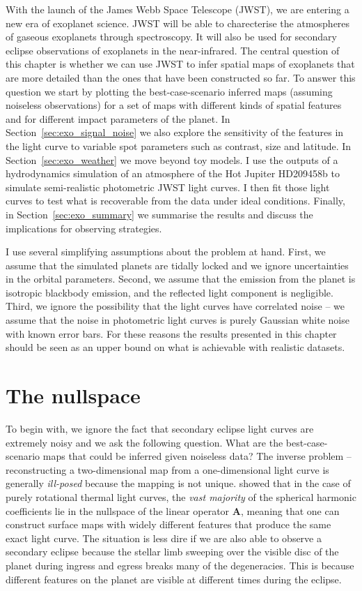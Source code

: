 \documentclass[12pt,dvipsnames]{report}
\begin{document}
With the launch of the James Webb Space Telescope (JWST), we are entering a new era of exoplanet 
science. JWST will be able to charecterise the atmospheres of gaseous exoplanets through 
spectroscopy. 
It will also be used for secondary eclipse observations of exoplanets 
in the near-infrared. The central question of this chapter is whether we can use JWST 
to infer spatial maps of exoplanets that are more detailed than the ones that have been constructed 
so far.
To answer this question we start by plotting the 
best-case-scenario inferred maps (assuming noiseless observations) for a set of maps 
with different kinds of spatial features and for different impact parameters of the planet. 
In Section~\ref{sec:exo_signal_noise} we also explore the sensitivity of the features in the light curve to variable spot parameters such
as contrast, size and latitude. 
In Section~\ref{sec:exo_weather} we move beyond toy models. I
use the outputs of a hydrodynamics simulation of an
atmosphere of the Hot Jupiter HD209458b to simulate semi-realistic photometric JWST light
curves. I then fit those light curves to test what is recoverable from the data under 
ideal conditions.
Finally, in Section~\ref{sec:exo_summary} we summarise the results and discuss the  
implications for observing strategies.

I use several simplifying assumptions about the problem at hand. 
First, we assume that the simulated planets are tidally locked and we ignore uncertainties in the
orbital parameters. Second, we assume that the emission from the planet is isotropic 
blackbody emission, and the reflected light component is negligible. Third, we ignore 
the possibility that the light curves have correlated noise -- we assume that the noise 
in photometric light curves is purely Gaussian white noise with known error bars.
For these reasons the results presented in this chapter should be seen as an upper bound 
on what is achievable with realistic datasets.

\section{The nullspace}
\label{sec:exo_nullspace}
To begin with, we ignore the fact that secondary eclipse light curves are extremely noisy 
and we ask the following question. What are the best-case-scenario maps that could be inferred 
given noiseless data?
The inverse problem -- reconstructing a two-dimensional map from a one-dimensional light curve is
generally \emph{ill-posed} because the mapping is not unique.
\citet{2021AJ....162..123L} showed that in the case of purely rotational thermal light curves, the
\emph{vast majority} of the spherical harmonic coefficients lie in the nullspace of the
linear operator $\mathbf{A}$, meaning that one can construct surface maps with widely different
features that produce the same exact light curve.
The situation is less dire if we are also able to observe a secondary eclipse because the stellar
limb sweeping over the visible disc of the planet during ingress and egress
breaks many of the degeneracies. 
This is because different features on the planet are visible at different times during the
eclipse.
\end{document}
